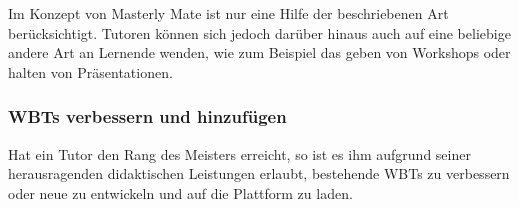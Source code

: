 Im Konzept von Masterly Mate ist nur eine Hilfe der beschriebenen Art
berücksichtigt. Tutoren können sich jedoch darüber hinaus auch auf eine
beliebige andere Art an Lernende wenden, wie zum Beispiel das geben von
Workshops oder halten von Präsentationen.

\subsubsection{WBTs verbessern und hinzufügen}
Hat ein Tutor den Rang des Meisters erreicht, so ist es ihm aufgrund seiner
herausragenden didaktischen Leistungen erlaubt, bestehende WBTs zu verbessern
oder neue zu entwickeln und auf die Plattform zu laden.